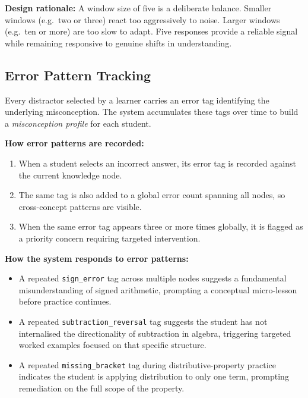 \documentclass[12pt,a4paper]{article}
\begin{document}
\begin{calloutbox}
\textbf{Design rationale:}
A window size of five is a deliberate balance.  Smaller windows (e.g.\ two or
three) react too aggressively to noise.  Larger windows (e.g.\ ten or more)
are too slow to adapt.  Five responses provide a reliable signal while
remaining responsive to genuine shifts in understanding.
\end{calloutbox}

\subsection{Error Pattern Tracking}

Every distractor selected by a learner carries an error tag identifying the
underlying misconception.  The system accumulates these tags over time to
build a \emph{misconception profile} for each student.

\medskip
\noindent\textbf{How error patterns are recorded:}

\begin{enumerate}[leftmargin=2em]
  \item When a student selects an incorrect answer, its error tag is
        recorded against the current knowledge node.
  \item The same tag is also added to a global error count spanning all
        nodes, so cross-concept patterns are visible.
  \item When the same error tag appears three or more times globally, it is
        flagged as a priority concern requiring targeted intervention.
\end{enumerate}

\medskip
\noindent\textbf{How the system responds to error patterns:}

\begin{itemize}[leftmargin=1.8em]
  \item A repeated \texttt{sign\_error} tag across multiple nodes suggests a
        fundamental misunderstanding of signed arithmetic, prompting a
        conceptual micro-lesson before practice continues.
  \item A repeated \texttt{subtraction\_reversal} tag suggests the student
        has not internalised the directionality of subtraction in algebra,
        triggering targeted worked examples focused on that specific structure.
  \item A repeated \texttt{missing\_bracket} tag during distributive-property
        practice indicates the student is applying distribution to only one
        term, prompting remediation on the full scope of the property.
\end{itemize}
\end{document}
